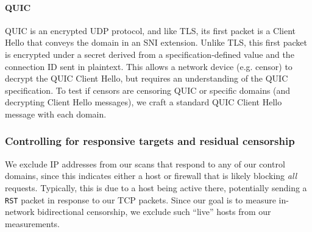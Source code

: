 \paragraph{QUIC} QUIC is an encrypted UDP protocol, and like TLS, its first
packet is a Client Hello that conveys the domain in an SNI extension. Unlike
TLS, this first packet is encrypted under a secret derived from a
specification-defined value and the connection ID sent in plaintext. This allows
a network device (e.g. censor) to decrypt the QUIC Client Hello, but requires an
understanding of the QUIC specification. To test if censors are censoring QUIC
or specific domains (and decrypting Client Hello messages), we craft a standard
QUIC Client Hello message with each domain.







\subsubsection{Controlling for responsive targets and residual censorship}
We exclude IP addresses from our scans that respond to any of our control
domains, since this indicates either a host or firewall that is likely blocking
\emph{all} requests. Typically, this is due to a host being active there,
potentially sending a \texttt{RST} packet in response to our TCP packets. Since
our goal is to measure in-network bidirectional censorship, we exclude such
``live'' hosts from our measurements.

